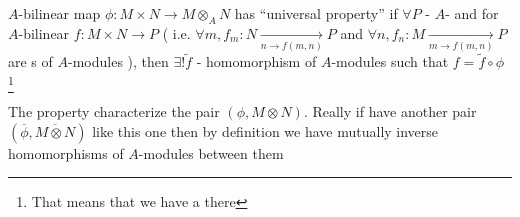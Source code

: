 \begin{definition}
  $A$-bilinear map $\phi: M \times N \to M \otimes_A N$ has
  ``universal property'' if
  $\forall P$ - $A$- and
  for $A$-bilinear $f: M \times N \to P$ (
  i.e.
  \(
  \forall m, f_m:
  N \xrightarrow[n \to f(m,n)]{} P
  \)
  and
  \(
  \forall n, f_n:
  M \xrightarrow[m \to f(m,n)]{} P
  \)
  are s of $A$-modules
  ), then
  $\exists! \tilde{f}$ - homomorphism of $A$-modules such that
  $f = \tilde{f} \circ \phi$
  \footnote{
    That means that we have a  there
  }

  \label{def:universalproperty}
\end{definition}

The property characterize the pair
$\left(\phi, M \otimes N\right)$.
Really if have another pair
$\left(\overline{\phi}, \overline{M \otimes N}\right)$
like this one then by definition we have mutually inverse
homomorphisms of $A$-modules between them

